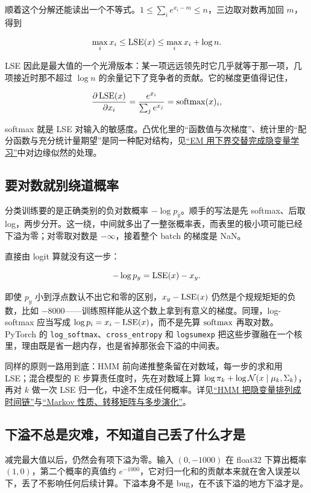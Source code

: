顺着这个分解还能读出一个不等式。\(1\le\sum_i e^{x_i-m}\le n\)，三边取对数再加回 \(m\)，得到

\[
\max_i x_i\le\operatorname{LSE}(x)\le\max_i x_i+\log n.
\]

LSE 因此是最大值的一个光滑版本：某一项远远领先时它几乎就等于那一项，几项接近时那不超过 \(\log n\) 的余量记下了竞争者的贡献。它的梯度更值得记住，

\[
\frac{\partial\operatorname{LSE}(x)}{\partial x_i}=\frac{e^{x_i}}{\sum_j e^{x_j}}=\operatorname{softmax}(x)_i,
\]

softmax 就是 LSE 对输入的敏感度。凸优化里的``函数值与次梯度''、统计里的``配分函数与充分统计量期望''是同一种配对结构，见\hyperref[sec:13-Machine-Learning/06-Probabilistic-Models/04]{``EM 用下界交替完成隐变量学习''}中对边缘似然的处理。

\subsection{要对数就别绕道概率}

分类训练要的是正确类别的负对数概率 \(-\log p_y\)。顺手的写法是先 softmax、后取 log，两步分开。这一绕，中间就多出了一整张概率表，而表里的极小项可能已经下溢为零；对零取对数是 \(-\infty\)，接着整个 batch 的梯度是 NaN。

直接由 logit 算就没有这一步：

\[
-\log p_y=\operatorname{LSE}(x)-x_y.
\]

即使 \(p_y\) 小到浮点数认不出它和零的区别，\(x_y-\operatorname{LSE}(x)\) 仍然是个规规矩矩的负数，比如 \(-8000\)——训练照样能从这个数上拿到有意义的梯度。同理，log-softmax 应当写成 \(\log p_i=x_i-\operatorname{LSE}(x)\)，而不是先算 \(\operatorname{softmax}\) 再取对数。PyTorch 的 \texttt{log\_softmax}、\texttt{cross\_entropy} 和 \texttt{logsumexp} 把这些步骤融在一个核里，理由既是省一趟内存，也是省掉那张会下溢的中间表。

同样的原则一路用到底：HMM 前向递推整条留在对数域，每一步的求和用 LSE；混合模型的 E 步算责任度时，先在对数域上算 \(\log\pi_k+\log\mathcal{N}(x\mid\mu_k,\Sigma_k)\)，再对 \(k\) 做一次 LSE 归一化，中途不生成任何概率。详见\hyperref[sec:13-Machine-Learning/06-Probabilistic-Models/05]{``HMM 把隐变量排列成时间链''}与\hyperref[sec:06-Random-Processes/03-Markov-Chains/01]{``Markov 性质、转移矩阵与多步演化''}。

\subsection{下溢不总是灾难，不知道自己丢了什么才是}

减完最大值以后，仍然会有项下溢为零。输入 \((0,-1000)\) 在 float32 下算出概率 \((1,0)\)，第二个概率的真值约 \(e^{-1000}\)，它对归一化和的贡献本来就在舍入误差以下，丢了不影响任何后续计算。下溢本身不是 bug，在不该下溢的地方下溢才是。

